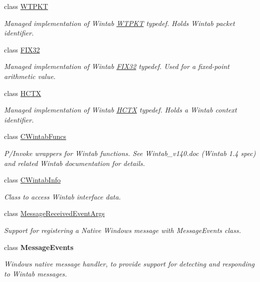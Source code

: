 \begin{DoxyCompactItemize}
class \hyperlink{class_wintab_d_n_1_1_w_t_p_k_t}{WTPKT}
\begin{DoxyCompactList}\small\item\em Managed implementation of Wintab \hyperlink{class_wintab_d_n_1_1_w_t_p_k_t}{WTPKT} typedef. Holds Wintab packet identifier. \item\end{DoxyCompactList}\item 
class \hyperlink{class_wintab_d_n_1_1_f_i_x32}{FIX32}
\begin{DoxyCompactList}\small\item\em Managed implementation of Wintab \hyperlink{class_wintab_d_n_1_1_f_i_x32}{FIX32} typedef. Used for a fixed-\/point arithmetic value. \item\end{DoxyCompactList}\item 
class \hyperlink{class_wintab_d_n_1_1_h_c_t_x}{HCTX}
\begin{DoxyCompactList}\small\item\em Managed implementation of Wintab \hyperlink{class_wintab_d_n_1_1_h_c_t_x}{HCTX} typedef. Holds a Wintab context identifier. \item\end{DoxyCompactList}\item 
class \hyperlink{class_wintab_d_n_1_1_c_wintab_funcs}{CWintabFuncs}
\begin{DoxyCompactList}\small\item\em P/Invoke wrappers for Wintab functions. See Wintab\_\-v140.doc (Wintab 1.4 spec) and related Wintab documentation for details. \item\end{DoxyCompactList}\item 
class \hyperlink{class_wintab_d_n_1_1_c_wintab_info}{CWintabInfo}
\begin{DoxyCompactList}\small\item\em Class to access Wintab interface data. \item\end{DoxyCompactList}\item 
class \hyperlink{class_wintab_d_n_1_1_message_received_event_args}{MessageReceivedEventArgs}
\begin{DoxyCompactList}\small\item\em Support for registering a Native Windows message with MessageEvents class. \item\end{DoxyCompactList}\item 
class {\bfseries MessageEvents}
\begin{DoxyCompactList}\small\item\em Windows native message handler, to provide support for detecting and responding to Wintab messages. \item\end{DoxyCompactList}\end{DoxyCompactItemize}
